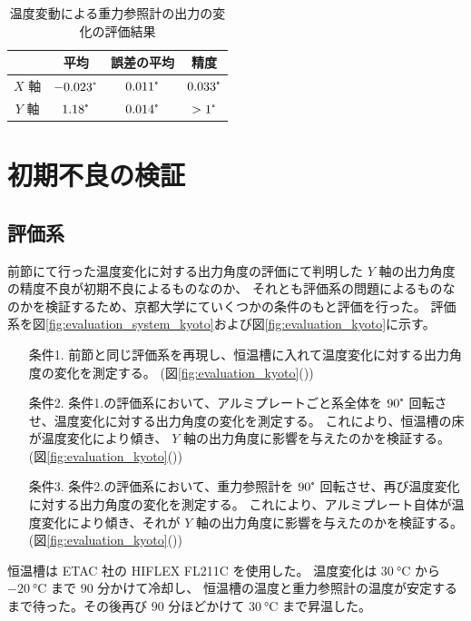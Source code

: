 \documentclass[../../main.tex]{subfiles}
\begin{document}
\begin{table}[H]
    \centering
    \caption{温度変動による重力参照計の出力の変化の評価結果}
    \begin{tabular}{cccc} \hline
        & 平均 & 誤差の平均 & 精度 \\ \hline\hline
        $X$ 軸 & $-0.023\tcdegree$ & $0.011\tcdegree$ & $0.033\tcdegree$ \\ \hline
        $Y$ 軸 & $1.18\tcdegree$ & $0.014\tcdegree$ & $>1\tcdegree$ \\ \hline
    \end{tabular}
    \label{tab:temp_result}
\end{table}
\section{初期不良の検証}
\subsection{評価系}
前節にて行った温度変化に対する出力角度の評価にて判明した $Y$ 軸の出力角度の精度不良が初期不良によるものなのか、
それとも評価系の問題によるものなのかを検証するため、京都大学にていくつかの条件のもと評価を行った。
評価系を図\ref{fig:evaluation_system_kyoto}および図\ref{fig:evaluation_kyoto}に示す。
\begin{enumerate}
    \item[条件1.] 前節と同じ評価系を再現し、恒温槽に入れて温度変化に対する出力角度の変化を測定する。
                 (図\ref{fig:evaluation_kyoto}())
    \item[条件2.] 条件1.の評価系において、アルミプレートごと系全体を $90\tcdegree$ 回転させ、温度変化に対する出力角度の変化を測定する。
                 これにより、恒温槽の床が温度変化により傾き、 $Y$ 軸の出力角度に影響を与えたのかを検証する。
                 (図\ref{fig:evaluation_kyoto}())
    \item[条件3.] 条件2.の評価系において、重力参照計を $90\tcdegree$ 回転させ、再び温度変化に対する出力角度の変化を測定する。
                 これにより、アルミプレート自体が温度変化により傾き、それが $Y$ 軸の出力角度に影響を与えたのかを検証する。
                 (図\ref{fig:evaluation_kyoto}())
\end{enumerate}
恒温槽は ETAC 社の HIFLEX FL211C を使用した。
温度変化は $\SI{30}{\degreeCelsius}$ から $\SI{-20}{\degreeCelsius}$ まで $90$ 分かけて冷却し、
恒温槽の温度と重力参照計の温度が安定するまで待った。その後再び $90$ 分ほどかけて $\SI{30}{\degreeCelsius}$ まで昇温した。
\end{document}
